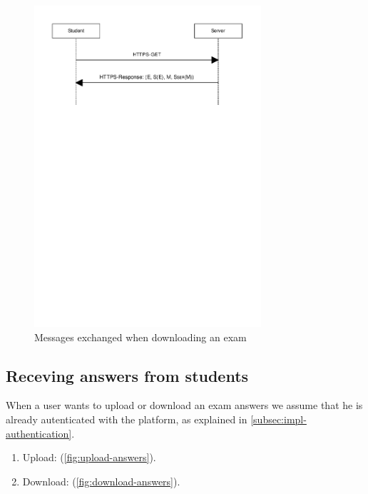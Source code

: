 \documentclass{article}
\begin{document}
\begin{figure}
  \begin{center}
  \includegraphics[width=0.75\textwidth]{images/download_exam.pdf}
  \caption{Messages exchanged when downloading an exam}
  \label{fig:download-exam}
  \end{center}
\end{figure}

\subsection{Receving answers from students}
\label{subsec:impl-answers}

When a user wants to upload or download an exam answers we assume that he is
already autenticated with the platform, as explained in
\autoref{subsec:impl-authentication}.

\begin{enumerate}
\item Upload: (\autoref{fig:upload-answers}).
\item Download: (\autoref{fig:download-answers}).
\end{enumerate}
\end{document}
